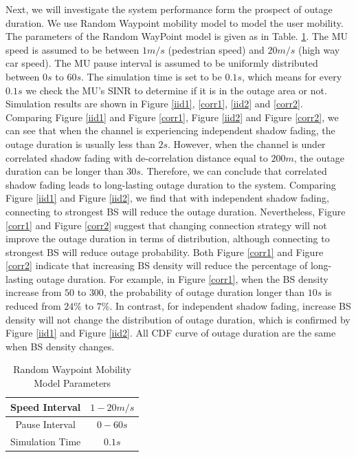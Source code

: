  \par Next, we will investigate the system performance form the prospect of outage duration. We use Random Waypoint mobility model to model the user mobility. The parameters of the Random WayPoint model is given as in Table. \ref{RWP}. The MU speed is assumed to be between $1m/s$ (pedestrian speed) and $20m/s$ (high way car speed). The MU pause interval is assumed to be uniformly distributed between $0s$ to $60s$. The simulation time is set to be $0.1s$, which means for every $0.1s$ we check the MU's SINR to determine if it is in the outage area or not. Simulation results are shown in Figure \ref{iid1}, \ref{corr1}, \ref{iid2} and \ref{corr2}. Comparing Figure \ref{iid1} and Figure \ref{corr1}, Figure \ref{iid2} and Figure \ref{corr2}, we can see that when the channel is experiencing independent shadow fading, the outage duration is usually less than $2s$. However,  when the channel is under correlated shadow fading with de-correlation distance equal to $200m$, the outage duration can be longer than $30s$. Therefore, we can conclude that correlated shadow fading leads to long-lasting outage duration to the system. Comparing Figure \ref{iid1} and Figure \ref{iid2}, we find that with independent shadow fading, connecting to strongest BS will reduce the outage duration.  Nevertheless, Figure \ref{corr1} and Figure \ref{corr2} suggest that changing connection strategy will not improve the outage duration in terms of distribution, although connecting to strongest BS will reduce outage probability. Both Figure \ref{corr1} and Figure \ref{corr2} indicate that increasing BS density will reduce the percentage of long-lasting outage duration. For example, in Figure \ref{corr1}, when the BS density increase from $50$ to $300$, the probability of outage duration longer than $10s$ is reduced from $24\%$ to $7\%$. In contrast, for independent shadow fading, increase BS density will not change the distribution of outage duration, which is confirmed by Figure \ref{iid1} and Figure \ref{iid2}. All CDF curve of outage duration are the same when BS density changes. 
 \begin{table}
 \centering
 \caption{\label{RWP}Random Waypoint Mobility Model Parameters}

 \begin{tabular}{|c|c|}

 \hline
 Speed Interval & $1 - 20m/s$\\
 \hline
 Pause Interval & $0 - 60s$\\
 \hline
 Simulation Time & $0.1s$\\
 \hline
 \end{tabular}

 \end{table}

